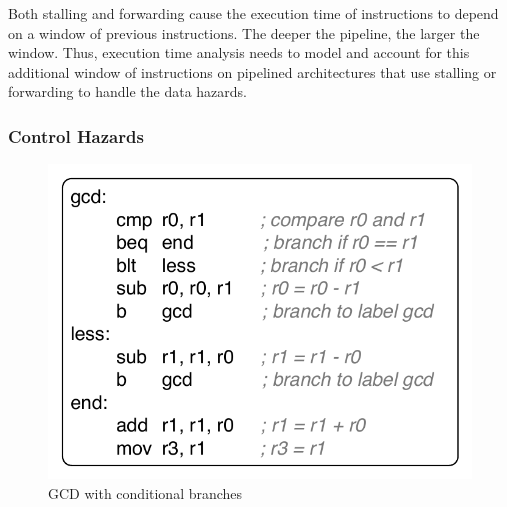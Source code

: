 Both stalling and forwarding cause the execution time of instructions to depend on a window of previous instructions.
The deeper the pipeline, the larger the window.
Thus, execution time analysis needs to model and account for this additional window of instructions on pipelined architectures that use stalling or forwarding to handle the data hazards. 

\subsubsection{Control Hazards}
\begin{figure}
  \vspace{-20pt}
  \begin{center}
    \includegraphics[scale=.65]{figs/sample_gcd_code}
  \end{center}
  \vspace{-3mm}
  \caption{GCD with conditional branches}
  \label{fig:sample_gcd_code}
\end{figure}

